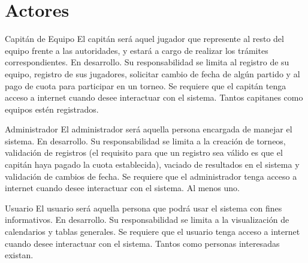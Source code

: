 \section{Actores}

\begin{Actor}{Capitán de Equipo} 
	\BRitem[Descripción:] El capitán será aquel jugador que represente al resto del equipo frente a las autoridades, y estará a cargo de realizar los trámites correspondientes.
	\BRitem[Estatus:] En desarrollo.
	\BRitem[Responsabilidades:] Su responsabilidad se limita al registro de su equipo,  registro de sus jugadores, solicitar cambio de fecha de algún partido y al pago de cuota para participar en un torneo.
	\BRitem[Perfil:] Se requiere que el capitán tenga acceso a internet cuando desee interactuar con el sistema.
	\BRitem[Cantidad:] Tantos capitanes como equipos estén registrados.
\end{Actor}

\begin{Actor}{Administrador} 
	\BRitem[Descripción:] El administrador será aquella persona encargada de manejar el sistema.
	\BRitem[Estatus:] En desarrollo.
	\BRitem[Responsabilidades:] Su responsabilidad se limita a la creación de torneos, validación de registros (el requisito para que un registro sea válido es que el capitán haya pagado la cuota establecida), vaciado de resultados en el sistema y validación de cambios de fecha.
	\BRitem[Perfil:] Se requiere que el administrador tenga acceso a internet cuando desee interactuar con el sistema.
	\BRitem[Cantidad:] Al menos uno.
\end{Actor}

\begin{Actor}{Usuario} 
	\BRitem[Descripción:] El usuario será aquella persona que podrá usar el sistema con fines informativos.
	\BRitem[Estatus:] En desarrollo.
	\BRitem[Responsabilidades:] Su responsabilidad se limita a la visualización de calendarios y tablas generales.
	\BRitem[Perfil:] Se requiere que el usuario tenga acceso a internet cuando desee interactuar con el sistema.
	\BRitem[Cantidad:] Tantos como personas interesadas existan.
\end{Actor}
